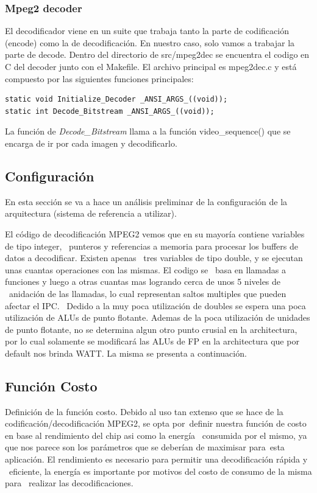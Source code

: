 \documentclass[journal]{IEEEtran}
\begin{document}
\subsubsection{Mpeg2 decoder}
El decodificador viene en un suite que trabaja tanto la parte de codificaci\'{o}n (encode) como la de decodificaci\'{o}n. En nuestro caso, solo vamos a trabajar la parte de decode.
Dentro del directorio de src/mpeg2dec se encuentra el codigo en C del decoder junto con el Makefile. El archivo principal es mpeg2dec.c y est\'{a} compuesto por las siguientes funciones principales:

\footnotesize \begin{verbatim}
static void Initialize_Decoder _ANSI_ARGS_((void));
static int Decode_Bitstream _ANSI_ARGS_((void));
\end{verbatim}
\normalsize

La funci\'{o}n de \textit{Decode\_Bitstream} llama a la funci\'{o}n video\_sequence() que se encarga de ir por cada imagen y decodificarlo. \newline

\subsection{Configuraci\'{o}n}
En esta secci\'{o}n se va a hace un an\'{a}lisis preliminar de la configuraci\'{o}n de la arquitectura (sistema de referencia a utilizar).

El c\'odigo de decodificaci\'on MPEG2 vemos que en su mayor\'ia contiene variables de tipo integer, \
punteros y referencias a memoria para procesar los buffers de datos a decodificar. Existen apenas \
tres variables de tipo double, y se ejecutan unas cuantas operaciones con las mismas.  El codigo se \
basa en llamadas a funciones y luego a otras cuantas mas logrando cerca de unos 5 niveles de \
anidaci\'on de las llamadas, lo cual representan saltos multiples que pueden afectar el IPC. \
Dedido a la muy poca utilizaci\'on de doubles se espera una poca utilizaci\'on de ALUs de punto flotante. \newline 
Ademas de la poca utilizaci\'on de unidades de punto flotante, no se determina algun otro punto crusial en la architectura, por lo cual solamente se modificar\'a las ALUs de FP en la architectura que por default nos brinda WATT.  La misma se presenta a continuaci\'on.

\subsection{Funci\'{o}n Costo}
Definici\'{o}n de la funci\'{o}n costo.
Debido al uso tan extenso que se hace de la codificaci\'{o}n/decodificaci\'{o}n MPEG2, se opta por\
definir nuestra funci\'{o}n de costo en base al rendimiento del chip asi como la energ\'{i}a \
consumida por el mismo, ya que nos parece son los par\'{a}metros que se deber\'{i}an de maximisar para\
esta aplicaci\'{o}n.  El rendimiento es necesario para permitir una decodificaci\'{o}n r\'{a}pida y \
eficiente, la energ\'{i}a es importante por motivos del costo de consumo de la misma para \
realizar las decodificaciones.
\end{document}
